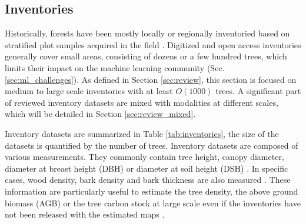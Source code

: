 \documentclass{CUP-JNL-DTM}%
\newcommand{\AOc}[1]{\textcolor{cyan}{[\textbf{Art}: #1]}}
\theoremstyle{definition}
\numberwithin{equation}{section}
\begin{document}
\subsection{Inventories}
\label{sec:review_inventories}

Historically, forests have been mostly locally or regionally inventoried based on stratified plot samples acquired in the field \cite{jucker_tallo_2022}.
Digitized and open access inventories generally cover small areas, consisting of dozens or a few hundred trees, which limits their impact on the machine learning community (Sec. \ref{sec:ml_challenges}). 
As defined in Section \ref{sec:review}, this section is focused on medium to large scale inventories with at least $O(1000)$ trees.
A significant part of reviewed inventory datasets are mixed with modalities at different scales, which will be detailed in Section \ref{sec:review_mixed}.

Inventory datasets are summarized in Table \ref{tab:inventories}, the size of the datasets is quantified by the number of trees. 
Inventory datasets are composed of various measurements. They commonly contain tree height, canopy diameter, diameter at breast height (DBH) or diameter at soil height (DSH) \cite{national_ecological_observatory_network_neon_vegetation_2023, gastauer_tree_2015, perez-luque_dataset_2015, perez-luque_land-use_2021, oliveira_structure_2017, jucker_tallo_2022}. In specific cases, wood density, bark density and bark thickness are also measured \cite{schepaschenko_forest_2019, farias_dataset_2020, kindermann_dataset_2022}. These information are particularly useful to estimate the tree density, the above ground biomass (AGB) or the tree carbon stock at large scale \cite{tucker_sub-continental-scale_2023} even if the inventories have not been released with the estimated maps \cite{patterson_statistical_2019, dionizio_carbon_2020}.
\end{document}
